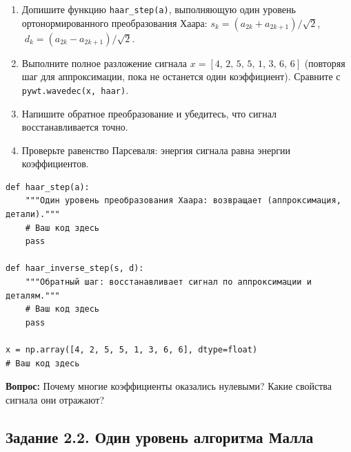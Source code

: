 \documentclass[12pt,a4paper,openany]{book}
\providecommand{\tightlist}{\setlength{\itemsep}{0pt}\setlength{\parskip}{0pt}}
\begin{document}
\begin{enumerate}
\def\labelenumi{\arabic{enumi}.}
\tightlist
\item
  Допишите функцию \texttt{haar\_\allowbreak{}step(\allowbreak{}a)}, выполняющую один уровень ортонормированного преобразования Хаара: \(s_k = (a_{2k} + a_{2k+1})/\sqrt2\), \(\;d_k = (a_{2k} - a_{2k+1})/\sqrt2\).
\item
  Выполните полное разложение сигнала \(x = [4,\,2,\,5,\,5,\,1,\,3,\,6,\,6]\) (повторяя шаг для аппроксимации, пока не останется один коэффициент). Сравните с \texttt{pywt.\allowbreak{}wavedec(\allowbreak{}x,\allowbreak{}\ \textquotesingle{}\allowbreak{}haar\textquotesingle{}\allowbreak{})}.
\item
  Напишите обратное преобразование и убедитесь, что сигнал восстанавливается точно.
\item
  Проверьте равенство Парсеваля: энергия сигнала равна энергии коэффициентов.
\end{enumerate}

\begin{Verbatim}[fontsize=\small, breaklines, breakanywhere, frame=single, framesep=2mm]
def haar_step(a):
    """Один уровень преобразования Хаара: возвращает (аппроксимация, детали)."""
    # Ваш код здесь
    pass

def haar_inverse_step(s, d):
    """Обратный шаг: восстанавливает сигнал по аппроксимации и деталям."""
    # Ваш код здесь
    pass

x = np.array([4, 2, 5, 5, 1, 3, 6, 6], dtype=float)
# Ваш код здесь
\end{Verbatim}

\textbf{Вопрос:} Почему многие коэффициенты оказались нулевыми? Какие свойства сигнала они отражают?

\subsection*{Задание 2.2. Один уровень алгоритма Малла}
\end{document}
